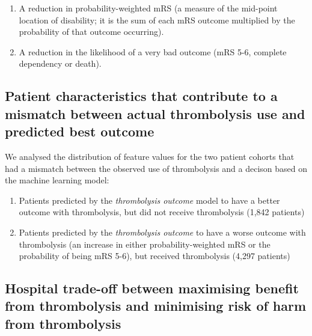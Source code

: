 \begin{enumerate}
    \item A reduction in probability-weighted mRS (a measure of the mid-point location of disability; it is the sum of each mRS outcome multiplied by the probability of that outcome occurring).
    \item A reduction in the likelihood of a very bad outcome (mRS 5-6, complete dependency or death).
\end{enumerate}

\subsection{Patient characteristics that contribute to a mismatch between actual thrombolysis use and predicted best outcome}

We analysed the distribution of feature values for the two patient cohorts that had a mismatch between the observed use of thrombolysis and a decison based on the machine learning model:

\begin{enumerate}
    \item Patients predicted by the \textit{thrombolysis outcome} model to have a better outcome with thrombolysis, but did not receive thrombolysis (1,842 patients) 
    
    \item Patients predicted by the \textit{thrombolysis outcome} to have a worse outcome with thrombolysis (an increase in either probability-weighted mRS or the probability of being mRS 5-6), but received thrombolysis (4,297 patients)
\end{enumerate}


\subsection{Hospital trade-off between maximising benefit from thrombolysis and minimising risk of harm from thrombolysis}

